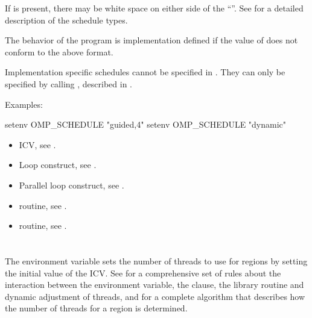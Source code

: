 If  is present, there may be white space on either side of the ``\code{,}''. See 
 for a detailed description of the schedule types.

The behavior of the program is implementation defined if the value of  
does not conform to the above format.

Implementation specific schedules cannot be specified in . They can 
only be specified by calling , described in . 

Examples:

\begin{boxedcode}
setenv OMP\_SCHEDULE "guided,4" 
setenv OMP\_SCHEDULE "dynamic"
\end{boxedcode}

\crossreferences
\begin{itemize}
\item {} ICV, see .

\item Loop construct, see .

\item Parallel loop construct, see .

\item {} routine, see .

\item {} routine, see .
\end{itemize}









\section{}
\label{sec:OMP_NUM_THREADS}
The  environment variable sets the number of threads to use for 
 regions by setting the initial value of the  ICV. See 
 for a comprehensive set of rules about the interaction between the 
 environment variable, the  clause, the 
 library routine and dynamic adjustment of threads, and 
for a complete algorithm that describes how the number of 
threads for a  region is determined.

